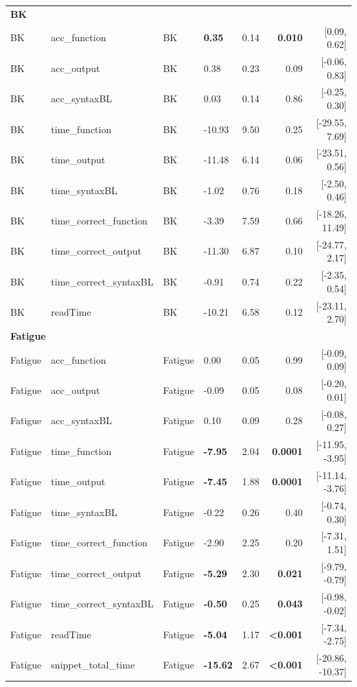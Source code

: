 \begin{table}[t]
\begin{tabular}{llllrrr}
\multicolumn{7}{l}{\textbf{BK}} \\
BK & acc\_function & BK & \textbf{0.35} & 0.14 & \textbf{0.010} & [0.09, 0.62] \\
BK & acc\_output & BK & 0.38 & 0.23 & 0.09 & [-0.06, 0.83] \\
BK & acc\_syntaxBL & BK & 0.03 & 0.14 & 0.86 & [-0.25, 0.30] \\
BK & time\_function & BK & -10.93 & 9.50 & 0.25 & [-29.55, 7.69] \\
BK & time\_output & BK & -11.48 & 6.14 & 0.06 & [-23.51, 0.56] \\
BK & time\_syntaxBL & BK & -1.02 & 0.76 & 0.18 & [-2.50, 0.46] \\
BK & time\_correct\_function & BK & -3.39 & 7.59 & 0.66 & [-18.26, 11.49] \\
BK & time\_correct\_output & BK & -11.30 & 6.87 & 0.10 & [-24.77, 2.17] \\
BK & time\_correct\_syntaxBL & BK & -0.91 & 0.74 & 0.22 & [-2.35, 0.54] \\
BK & readTime & BK & -10.21 & 6.58 & 0.12 & [-23.11, 2.70] \\

\midrule

\multicolumn{7}{l}{\textbf{Fatigue}} \\
Fatigue & acc\_function & Fatigue & 0.00 & 0.05 & 0.99 & [-0.09, 0.09] \\
Fatigue & acc\_output & Fatigue & -0.09 & 0.05 & 0.08 & [-0.20, 0.01] \\
Fatigue & acc\_syntaxBL & Fatigue & 0.10 & 0.09 & 0.28 & [-0.08, 0.27] \\
Fatigue & time\_function & Fatigue & \textbf{-7.95} & 2.04 & \textbf{0.0001} & [-11.95, -3.95] \\
Fatigue & time\_output & Fatigue & \textbf{-7.45} & 1.88 & \textbf{0.0001} & [-11.14, -3.76] \\
Fatigue & time\_syntaxBL & Fatigue & -0.22 & 0.26 & 0.40 & [-0.74, 0.30] \\
Fatigue & time\_correct\_function & Fatigue & -2.90 & 2.25 & 0.20 & [-7.31, 1.51] \\
Fatigue & time\_correct\_output & Fatigue & \textbf{-5.29} & 2.30 & \textbf{0.021} & [-9.79, -0.79] \\
Fatigue & time\_correct\_syntaxBL & Fatigue & \textbf{-0.50} & 0.25 & \textbf{0.043} & [-0.98, -0.02] \\
Fatigue & readTime & Fatigue & \textbf{-5.04} & 1.17 & \textbf{<0.001} & [-7.34, -2.75] \\
Fatigue & snippet\_total\_time & Fatigue & \textbf{-15.62} & 2.67 & \textbf{<0.001} & [-20.86, -10.37] \\

\bottomrule
\end{tabular}
\end{table}

